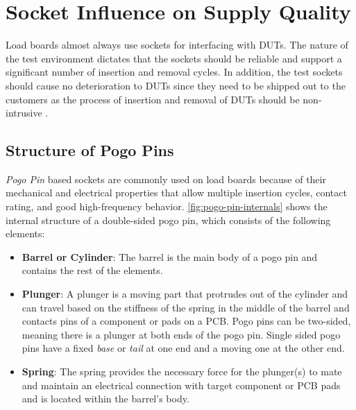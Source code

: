 


\section{Socket Influence on Supply Quality}
\label{sec:socket-influence}


Load boards almost always use sockets for interfacing with \acp{DUT}.
The nature of the test environment dictates that the sockets should be
reliable and support a significant number of insertion and removal cycles.
In addition, the test sockets should cause no deterioration to \acp{DUT} since
they need to be shipped out to the customers as the process of
insertion and removal of \acp{DUT} should be non-intrusive \autocite{4770348}.


\subsection{Structure of Pogo Pins}
\label{subsec:pogo-pins}

\emph{Pogo Pin} based sockets are commonly used on load boards
because of their mechanical and electrical properties that allow multiple
insertion cycles, contact rating, and good high-frequency behavior.
\autoref{fig:pogo-pin-internals} shows the internal structure of a double-sided
pogo pin, which consists of the following elements:

\begin{itemize}[topsep=8pt,itemsep=4pt,partopsep=4pt, parsep=4pt]

    \item \textbf{Barrel or Cylinder}:
    The barrel is the main body of a pogo pin and contains the rest of the
    elements.

    \item \textbf{Plunger}:
    A plunger is a moving part that protrudes out of the cylinder and can
    travel based on the stiffness of the spring in the middle of the
    barrel and contacts pins of a component or pads on a \ac{PCB}.
    Pogo pins can be two-sided, meaning there is a plunger at both ends of the
    pogo pin. Single sided pogo pins have a fixed \emph{base} or \emph{tail}
    at one end and a moving one at the other end.

    \item \textbf{Spring}:
    The spring provides the necessary force
    for the plunger(s) to mate and maintain an electrical connection with
    target component or \ac{PCB} pads and is located within the barrel's body.

\end{itemize}

